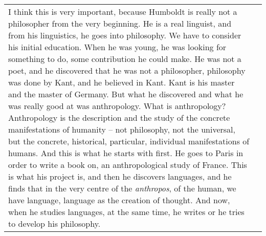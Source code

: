 \documentclass[12pt]{article}
\begin{document}
\begin{flushleft}
\begin{supertabular}{m{0.24415985in}m{5.89766in}}
I think this is very important, because Humboldt is really not a philosopher from the very beginning. He is a real linguist, and from his linguistics, he goes into philosophy. We have to consider his initial education. When he was young, he was looking for something to do, some contribution he could make. He was not a poet, and he discovered that he was not a philosopher, philosophy was done by Kant, and he believed in Kant. Kant is his master and the master of Germany. But what he discovered and what he was really good at was anthropology. What is anthropology? Anthropology is the description and the study of the concrete manifestations of humanity – not philosophy, not the universal, but the concrete, historical, particular, individual manifestations of humans. And this is what he starts with first. He goes to Paris in order to write a book on, an anthropological study of France. This is what his project is, and then he discovers languages, and he finds that in the very centre of the \textit{anthropos}, of the human, we have language, language as the creation of thought. And now, when he studies languages, at the same time, he writes or he tries to develop his philosophy. 


\end{supertabular}
\end{flushleft}
\end{document}
